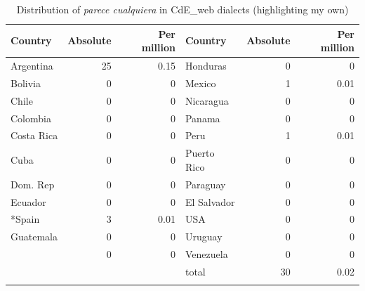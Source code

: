\begin{table}
%
%
%
%

\begin{tabularx}{\textwidth}{lrr Xrr}
    \lsptoprule
    Country & Absolute & Per million & Country & Absolute & Per million\\
\midrule
  Argentina  &   25    &  0.15      &    Honduras    &  0     &  0    \\
  Bolivia    &   0    &  0      &    Mexico      &   1    &  0.01    \\
  Chile      &  0     &   0     &    Nicaragua   &  0     &   0   \\
  Colombia   &  0     &    0    &    Panama      &  0     &   0   \\
  Costa Rica &   0    &   0     &    Peru        &   1    &   0.01   \\
  Cuba       &  0     &    0    &    Puerto Rico &   0    &   0   \\
  Dom. Rep   &   0    &    0    &    Paraguay    &   0    &   0   \\
  Ecuador    &    0   &    0    &    El Salvador &    0   &   0   \\
  *Spain     &   3    &    0.01    &    USA         &   0    &  0    \\
  Guatemala  &    0   &    0    &    Uruguay     &  0     &  0    \\
             &  0     &    0    &    Venezuela   &   0    &   0   \\
\midrule
             &       &          &  {total} &  30    &  {0.02}     \\
  \lspbottomrule
\end{tabularx}

\caption{\label{tab:key:9} Distribution of \textit{parece cualquiera} in CdE\_web dialects (highlighting my own)}
\end{table}

